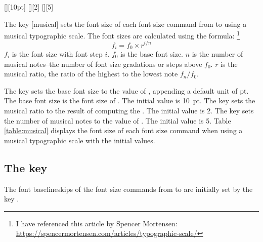 \documentclass{beery}
\begin{document}


\begin{mydisplaycode}
  [][10pt]%
  \nopagebreak\newline
  [][2]%
  \nopagebreak\newline
  [][5]
\end{mydisplaycode}

The key [musical] sets the font size of each font size command from  to  using a musical typographic scale.
The font sizes are calculated using the formula:%
\footnote
  {%
    I have referenced this article by Spencer Mortensen:
    \newline
    \url{https://spencermortensen.com/articles/typographic-scale/}%
  }
\begin{equation}\label{eq:musical}
  f_i = f_0 \times r ^ { i / n }
\end{equation}
$f_i$ is the font size with font step $i$.
$f_0$ is the base font size.
$n$ is the number of musical notes\---the number of font size gradations or steps above $f_0$.
$r$ is the musical ratio, the ratio of the highest to the lowest note $ f_n / f_0 $.

The key  sets the base font size to the value of , appending a default unit of \unit{pt}.
The base font size is the font size of .
The initial value is \qty{10}{pt}.
The key  sets the musical ratio to the result of computing the .
The initial value is \num{2}.
The key  sets the number of musical notes to the value of .
The initial value is \num{5}.
Table \ref{table:musical} displays the font size of each font size command when using a musical typographic scale with the initial values.



\subsection
  {%
    The key
    \texorpdfstring
      {}
      {baselineskip-size-ratio}%
  }
\label{subsec:baselineskipsizeratio}

The font baselineskips of the font size commands from  to  are initially set by the key .
\end{document}
